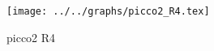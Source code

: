 \begin{figure}[h] \centering\texttt{[image: ../../graphs/picco2\_R4.tex]}\caption{picco2 R4}\label{gr:picco2_R4} \end{figure}

